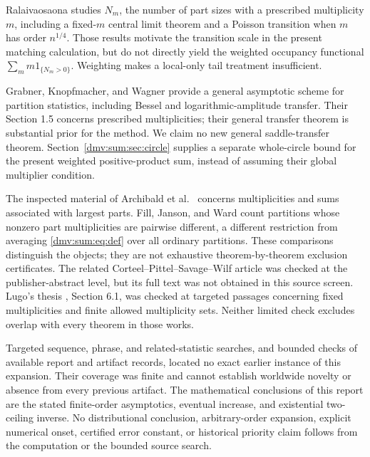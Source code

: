 \documentclass[11pt,letterpaper]{article}
\numberwithin{equation}{section}
\theoremstyle{definition}\newtheorem{definition}[theorem]{Definition}
\theoremstyle{remark}\newtheorem{remark}[theorem]{Remark}
\begin{document}
Ralaivaosaona \cite{ralaivaosaona} studies $N_m$, the number of part sizes with a prescribed multiplicity $m$, including a fixed-$m$ central limit theorem and a Poisson transition when $m$ has order $n^{1/4}$. Those results motivate the transition scale in the present matching calculation, but do not directly yield the weighted occupancy functional $\sum_m m1_{\{N_m>0\}}$. Weighting makes a local-only tail treatment insufficient.

Grabner, Knopfmacher, and Wagner \cite{gkw} provide a general asymptotic scheme for partition statistics, including Bessel and logarithmic-amplitude transfer. Their Section 1.5 concerns prescribed multiplicities; their general transfer theorem is substantial prior for the method. We claim no new general saddle-transfer theorem. Section~\ref{dmv:sum:sec:circle} supplies a separate whole-circle bound for the present weighted positive-product sum, instead of assuming their global multiplier condition.

The inspected material of Archibald et al.\ \cite{archibald} concerns multiplicities and sums associated with largest parts. Fill, Janson, and Ward \cite{fill} count partitions whose nonzero part multiplicities are pairwise different, a different restriction from averaging \eqref{dmv:sum:eq:def} over all ordinary partitions. These comparisons distinguish the objects; they are not exhaustive theorem-by-theorem exclusion certificates. The related Corteel--Pittel--Savage--Wilf article \cite{cpsw} was checked at the publisher-abstract level, but its full text was not obtained in this source screen. Lugo's thesis \cite{lugo}, Section 6.1, was checked at targeted passages concerning fixed multiplicities and finite allowed multiplicity sets. Neither limited check excludes overlap with every theorem in those works.

Targeted sequence, phrase, and related-statistic searches, and bounded checks of available report and artifact records, located no exact earlier instance of this expansion. Their coverage was finite and cannot establish worldwide novelty or absence from every previous artifact. The mathematical conclusions of this report are the stated finite-order asymptotics, eventual increase, and existential two-ceiling inverse. No distributional conclusion, arbitrary-order expansion, explicit numerical onset, certified error constant, or historical priority claim follows from the computation or the bounded source search.
\end{document}
